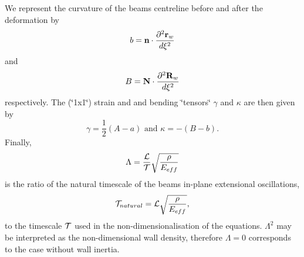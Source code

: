 We represent the curvature of the beam\textquotesingle{}s centreline before and after the deformation by \[ b = {\bf n} \cdot \frac{\partial^2 {\bf r}_w}{d\xi^2} \] and \[ B = {\bf N} \cdot \frac{\partial^2 {\bf R}_w}{d\xi^2} \] respectively. The (\char`\"{}1x1\char`\"{}) strain and and bending \char`\"{}tensors\char`\"{} $ \gamma $ and $ \kappa $ are then given by \[ \gamma = \frac{1}{2}\left(A-a\right) \mbox{\ \ \ and \ \ \ } \kappa = - \left( B-b \right). \] Finally, \[ \Lambda = \frac{{\cal L}}{{\cal T}} \sqrt{\frac{\rho}{E_{eff}}} \] is the ratio of the natural timescale of the beam\textquotesingle{}s in-\/plane extensional oscillations, \[ {\cal T}_{natural} = {\cal L} \sqrt{\frac{\rho}{E_{eff}}}, \] to the timescale $ {\cal T}$ used in the non-\/dimensionalisation of the equations. $ \Lambda^2 $ may be interpreted as the non-\/dimensional wall density, therefore $ \Lambda=0 $ corresponds to the case without wall inertia.

